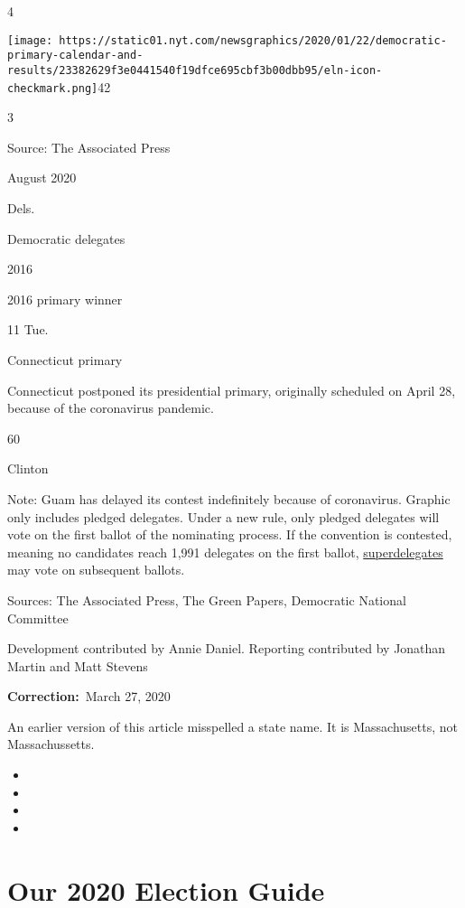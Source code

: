 4

\texttt{[image: https://static01.nyt.com/newsgraphics/2020/01/22/democratic-primary-calendar-and-results/23382629f3e0441540f19dfce695cbf3b00dbb95/eln-icon-checkmark.png]}42

3

Source: The Associated Press

August 2020

Dels.

Democratic delegates

2016

2016 primary winner

11 Tue.

Connecticut primary

Connecticut postponed its presidential primary, originally scheduled on
April 28, because of the coronavirus pandemic.

60

Clinton

Note: Guam has delayed its contest indefinitely because of coronavirus.
Graphic only includes pledged delegates. Under a new rule, only pledged
delegates will vote on the first ballot of the nominating process. If
the convention is contested, meaning no candidates reach 1,991 delegates
on the first ballot,
\href{https://www.nytimes.com/2018/08/25/us/politics/superdelegates-democrats-dnc.html}{superdelegates}
may vote on subsequent ballots.

Sources: The Associated Press, The Green Papers, Democratic National
Committee

Development contributed by Annie Daniel. Reporting contributed by
Jonathan Martin and Matt Stevens

\textbf{Correction:}~March 27, 2020

An earlier version of this article misspelled a state name. It is
Massachusetts, not Massachussetts.

\begin{itemize}
\item
\item
\item
\item
\end{itemize}

\hypertarget{our-2020-election-guide}{%
\section{Our 2020 Election Guide}\label{our-2020-election-guide}}

